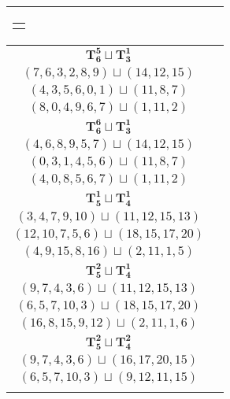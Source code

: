 \documentclass{article}
\begin{document}
\begin{longtable}{|c|c|}
\begin{tabular}{c}
        $(7,0,6,4,9,12)\sqcup(1,11,2)$
        \end{tabular} \\ 
        \hline
        $\mathbf{T_{6}^{5}} \sqcup \mathbf{T_{3}^{1}}$ & \begin{tabular}{c}
        $(0,2,4,7,1,5)\sqcup(12,11,13)$ \\ 
        $(7,6,3,2,8,9)\sqcup(14,12,15)$ \\ 
        $(4,3,5,6,0,1)\sqcup(11,8,7)$ \\ 
        $(8,0,4,9,6,7)\sqcup(1,11,2)$
        \end{tabular} \\ 
        \hline
        $\mathbf{T_{6}^{6}} \sqcup \mathbf{T_{3}^{1}}$ & \begin{tabular}{c}
        $(0,2,1,3,4,5)\sqcup(12,11,14)$ \\ 
        $(4,6,8,9,5,7)\sqcup(14,12,15)$ \\ 
        $(0,3,1,4,5,6)\sqcup(11,8,7)$ \\ 
        $(4,0,8,5,6,7)\sqcup(1,11,2)$
        \end{tabular} \\ 
        \hline
        $\mathbf{T_{5}^{1}} \sqcup \mathbf{T_{4}^{1}}$ & \begin{tabular}{c}
        $(2,4,6,9,12)\sqcup(16,15,14,13)$ \\ 
        $(3,4,7,9,10)\sqcup(11,12,15,13)$ \\ 
        $(12,10,7,5,6)\sqcup(18,15,17,20)$ \\ 
        $(4,9,15,8,16)\sqcup(2,11,1,5)$
        \end{tabular} \\ 
        \hline
        $\mathbf{T_{5}^{2}} \sqcup \mathbf{T_{4}^{1}}$ & \begin{tabular}{c}
        $(12,9,6,4,11)\sqcup(17,16,15,14)$ \\ 
        $(9,7,4,3,6)\sqcup(11,12,15,13)$ \\ 
        $(6,5,7,10,3)\sqcup(18,15,17,20)$ \\ 
        $(16,8,15,9,12)\sqcup(2,11,1,6)$
        \end{tabular} \\ 
        \hline
        $\mathbf{T_{5}^{2}} \sqcup \mathbf{T_{4}^{2}}$ & \begin{tabular}{c}
        $(4,6,9,11,8)\sqcup(16,15,18,14)$ \\ 
        $(9,7,4,3,6)\sqcup(16,17,20,15)$ \\ 
        $(6,5,7,10,3)\sqcup(9,12,11,15)$ \\ 

\end{tabular}
\end{longtable}
\end{document}
